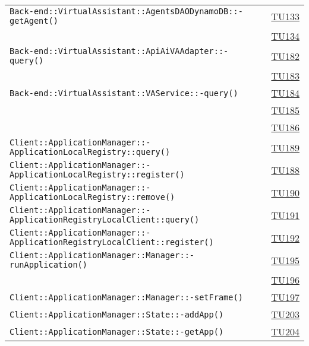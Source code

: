 \begin{longtable}{|>{\centering}m{12cm}|m{1cm}<{\centering}|}
\texttt{Back-end::VirtualAssistant::AgentsDAODynamoDB::-\linebreak getAgent()} & \hyperlink{TU133}{TU133}\\ & \hyperlink{TU134}{TU134}\\ \hline
\texttt{Back-end::VirtualAssistant::ApiAiVAAdapter::-\linebreak query()} & \hyperlink{TU182}{TU182}\\ & \hyperlink{TU183}{TU183}\\ \hline
\texttt{Back-end::VirtualAssistant::VAService::-\linebreak query()} & \hyperlink{TU184}{TU184}\\ & \hyperlink{TU185}{TU185}\\ & \hyperlink{TU186}{TU186}\\ \hline
\texttt{Client::ApplicationManager::-\linebreak ApplicationLocalRegistry::query()} & \hyperlink{TU189}{TU189}\\ \hline
\texttt{Client::ApplicationManager::-\linebreak ApplicationLocalRegistry::register()} & \hyperlink{TU188}{TU188}\\ \hline
\texttt{Client::ApplicationManager::-\linebreak ApplicationLocalRegistry::remove()} & \hyperlink{TU190}{TU190}\\ \hline
\texttt{Client::ApplicationManager::-\linebreak ApplicationRegistryLocalClient::query()} & \hyperlink{TU191}{TU191}\\ \hline
\texttt{Client::ApplicationManager::-\linebreak ApplicationRegistryLocalClient::register()} & \hyperlink{TU192}{TU192}\\ \hline
\texttt{Client::ApplicationManager::Manager::-\linebreak runApplication()} & \hyperlink{TU195}{TU195}\\ & \hyperlink{TU196}{TU196}\\ \hline
\texttt{Client::ApplicationManager::Manager::-\linebreak setFrame()} & \hyperlink{TU197}{TU197}\\ \hline
\texttt{Client::ApplicationManager::State::-\linebreak addApp()} & \hyperlink{TU203}{TU203}\\ \hline
\texttt{Client::ApplicationManager::State::-\linebreak getApp()} & \hyperlink{TU204}{TU204}\\ \hline

\end{longtable}
